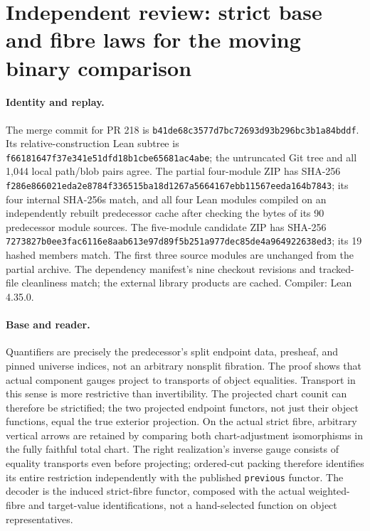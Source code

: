 \section*{Independent review: strict base and fibre laws for the moving binary comparison}
\paragraph{Identity and replay.}
The merge commit for PR 218 is \texttt{b41de68c3577d7bc72693d93b296bc3b1a84bddf}.
Its relative-construction Lean subtree is \texttt{f66181647f37e341e51dfd18b1cbe65681ac4abe};
the untruncated Git tree and all 1,044 local path/blob pairs agree.
The partial four-module ZIP has SHA-256 \texttt{f286e866021eda2e8784f336515ba18d1267a5664167ebb11567eeda164b7843};
its four internal SHA-256s match, and all four Lean modules compiled on an independently rebuilt predecessor cache after checking the bytes of its 90 predecessor module sources.
The five-module candidate ZIP has SHA-256 \texttt{7273827b0ee3fac6116e8aab613e97d89f5b251a977dec85de4a964922638ed3};
its 19 hashed members match. The first three source modules are unchanged from the partial archive.
The dependency manifest's nine checkout revisions and tracked-file cleanliness match; the external library products are cached. Compiler: Lean 4.35.0.
\paragraph{Base and reader.}
Quantifiers are precisely the predecessor's split endpoint data, presheaf, and pinned universe indices, not an arbitrary nonsplit fibration.
The proof shows that actual component gauges project to transports of object equalities. Transport in this sense is more restrictive than invertibility.
The projected chart counit can therefore be strictified; the two projected endpoint functors, not just their object functions, equal the true exterior projection.
On the actual strict fibre, arbitrary vertical arrows are retained by comparing both chart-adjustment isomorphisms in the fully faithful total chart.
The right realization's inverse gauge consists of equality transports even before projecting; ordered-cut packing therefore identifies its entire restriction independently with the published \texttt{previous} functor.
The decoder is the induced strict-fibre functor, composed with the actual weighted-fibre and target-value identifications, not a hand-selected function on object representatives.
